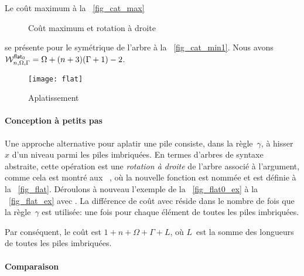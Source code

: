 Le coût maximum à la
\fig~\ref{fig_cat_max}
\begin{figure}
\centering
{}
\qquad
{}
\qquad
{}
\caption{Coût maximum et rotation à droite}
\end{figure}
se présente pour le symétrique de l'arbre à la
\fig~\ref{fig_cat_min1}. Nous
avons
\(\W{\fun{flat}_0}{n,\Omega,\Gamma} = \Omega + (n+3)(\Gamma+1) - 2\).

%
\begin{wrapfigure}[7]{r}[0pt]{0pt}
\centering
\texttt{[image: flat]}%
\caption{Aplatissement\label{fig_flat}
}
\end{wrapfigure}

\paragraph{Conception à petits pas}

Une approche alternative pour aplatir une pile consiste, dans la
règle~\(\gamma\), à hisser~\(x\) d'un niveau parmi les piles
imbriquées. En termes d'arbres de syntaxe abstraite, cette opération
est une \emph{rotation à droite} de
l'arbre associé à l'argument, comme cela est montré aux
\figs~, où la nouvelle fonction est
nommée  et est définie à la
\fig~\vref{fig_flat}. Déroulons à nouveau l'exemple de la
\fig~\vref{fig_flat0_ex} à la \fig~\vref{fig_flat_ex} avec
. La différence de coût avec
 réside dans le nombre
de fois que la règle~\(\gamma\) est utilisée: une fois pour chaque
élément de toutes les piles imbriquées.

Par conséquent, le coût
\label{cost_flat} est \(1 + n + \Omega
+ \Gamma + L\), où \(L\)~est la somme des longueurs de toutes les
piles imbriquées.

\paragraph{Comparaison}

